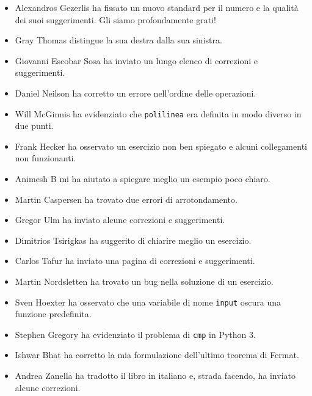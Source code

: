 \documentclass[10pt]{book}
\begin{document}
\begin{itemize}
\item Alexandros Gezerlis ha fissato un nuovo standard per il numero e la qualità dei suoi suggerimenti. Gli siamo profondamente grati!

\item Gray Thomas distingue la sua destra dalla sua sinistra.

\item Giovanni Escobar Sosa ha inviato un lungo elenco di correzioni e suggerimenti.

\item Daniel Neilson ha corretto un errore nell'ordine delle operazioni.

\item Will McGinnis ha evidenziato che {\tt polilinea} era definita in modo diverso in due punti.

\item Frank Hecker ha osservato un esercizio non ben spiegato e alcuni collegamenti non funzionanti.

\item Animesh B mi ha aiutato a spiegare meglio un esempio poco chiaro.

\item Martin Caspersen ha trovato due errori di arrotondamento.

\item Gregor Ulm ha inviato alcune correzioni e suggerimenti.

\item Dimitrios Tsirigkas ha suggerito di chiarire meglio un esercizio.

\item Carlos Tafur ha inviato una pagina di correzioni e suggerimenti.

\item Martin Nordsletten ha trovato un bug nella soluzione di un esercizio.

\item Sven Hoexter ha osservato che una variabile di nome {\tt input}
oscura una funzione predefinita.

\item Stephen Gregory ha evidenziato il problema di {\tt cmp} in Python 3.

\item Ishwar Bhat ha corretto la mia formulazione dell'ultimo teorema di Fermat.

\item Andrea Zanella ha tradotto il libro in italiano e, strada facendo, ha inviato alcune correzioni.


\end{itemize}
\end{document}
